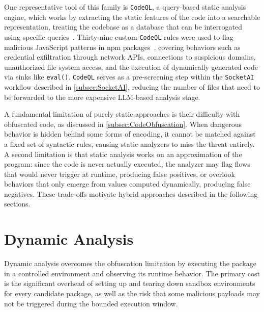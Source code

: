 One representative tool of this family is \texttt{CodeQL}, a query-based static analysis engine,
which works by extracting the static features of the code into a searchable representation,
treating the codebase as a database that can be interrogated using specific queries~\cite{zahan2025leveraginglargelanguagemodels}.
Thirty-nine custom \texttt{CodeQL} rules were used to flag malicious JavaScript patterns in \ac{npm} packages~\cite{zahan2025leveraginglargelanguagemodels},
covering behaviors such as credential exfiltration through network \acp{API}, 
connections to suspicious domains, unauthorized file system access, and the execution of dynamically generated code via sinks like \texttt{eval()}.
\texttt{CodeQL} serves as a pre-screening step within the \texttt{SocketAI} workflow described in \cref{subsec:SocketAI},
reducing the number of files that need to be forwarded to the more expensive \ac{LLM}-based analysis stage.

A fundamental limitation of purely static approaches is their difficulty with obfuscated code,
as discussed in \cref{subsec:CodeObfuscation}.
When dangerous behavior is hidden behind some forms of encoding,
it cannot be matched against a fixed set of syntactic rules,
causing static analyzers to miss the threat entirely.
A second limitation is that static analysis works on an approximation of the program:
since the code is never actually executed, the analyzer may flag flows that would never trigger at runtime, 
producing false positives, or overlook behaviors that only emerge from values computed dynamically, producing false negatives.
These trade-offs motivate hybrid approaches described in the following sections.

\section{Dynamic Analysis}
\label{sec:dynamicAnalysis}

Dynamic analysis overcomes the obfuscation limitation by executing the package in a controlled environment and observing its runtime behavior. 
The primary cost is the significant overhead of setting up and tearing down sandbox environments for every candidate package, 
as well as the risk that some malicious payloads may not be triggered during the bounded execution window.

